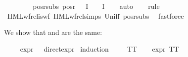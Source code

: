 \begin{isabellebody}
\ \ \ \ \isamarkupfalse%
\isanewline
\ \ \isamarkupfalse%
\isanewline
{}\isamarkupfalse%
%
\endisatagproof
{\isafoldproof}%
%
\isadelimproof
\isanewline
%
\endisadelimproof
\isanewline
{}\isamarkupfalse%
\ pos{\isacharunderscore}{\kern0pt}r{\isacharunderscore}{\kern0pt}subs{\isacharcolon}{\kern0pt}\ {\isachardoublequoteopen}pos{\isacharunderscore}{\kern0pt}r\ {\isacharparenleft}{\kern0pt}{\isasymPhi}\ {\isacharbackquote}{\kern0pt}\ I{\isacharparenright}{\kern0pt}\ {\isasymsubseteq}\ {\isacharparenleft}{\kern0pt}{\isasymPhi}\ {\isacharbackquote}{\kern0pt}\ I{\isacharparenright}{\kern0pt}{\isachardoublequoteclose}\isanewline
%
\isadelimproof
\ \ %
\endisadelimproof
%
\isatagproof
{}\isamarkupfalse%
\ auto%
\endisatagproof
{\isafoldproof}%
%
\isadelimproof
\isanewline
%
\endisadelimproof
\isanewline
{}\isamarkupfalse%
\isanewline
%
\isadelimproof
\ \ %
\endisadelimproof
%
\isatagproof
{}\isamarkupfalse%
\ rule\isanewline
\ \ \isamarkupfalse%
\ HML{\isacharunderscore}{\kern0pt}wf{\isacharunderscore}{\kern0pt}rel{\isacharunderscore}{\kern0pt}is{\isacharunderscore}{\kern0pt}wf\ HML{\isacharunderscore}{\kern0pt}wf{\isacharunderscore}{\kern0pt}rel{\isachardot}{\kern0pt}simps\ Un{\isacharunderscore}{\kern0pt}iff\ pos{\isacharunderscore}{\kern0pt}r{\isacharunderscore}{\kern0pt}subs\ \isamarkupfalse%
\ fastforce{\isacharplus}{\kern0pt}%
\endisatagproof
{\isafoldproof}%
%
\isadelimproof
%
\endisadelimproof
%
\begin{isamarkuptext}%
We show that  and  are the same:%
\end{isamarkuptext}\isamarkuptrue%
%
\isadelimvisible
%
\endisadelimvisible
%
\isatagvisible
%
\endisatagvisible
{\isafoldvisible}%
%
\isadelimvisible
\isanewline
%
\endisadelimvisible
{}\isamarkupfalse%
\ \isanewline
\ \ \ {\isachardoublequoteopen}expr\ {\isasymphi}\ {\isacharequal}{\kern0pt}\ direct{\isacharunderscore}{\kern0pt}expr\ {\isasymphi}{\isachardoublequoteclose}\isanewline
%
\isadelimproof
%
\endisadelimproof
%
\isatagproof
{}\isamarkupfalse%
{\isacharparenleft}{\kern0pt}induction\ {\isasymphi}{\isacharparenright}{\kern0pt}\isanewline
\ \ \isamarkupfalse%
\ TT\isanewline
\ \ \isamarkupfalse%
\ {\isachardoublequoteopen}expr\ TT\ {\isacharequal}{\kern0pt}\ {\isacharparenleft}{\kern0pt}{}{\isacharcomma}{\kern0pt}\ {}{\isacharcomma}{\kern0pt}\ {}{\isacharcomma}{\kern0pt}\ {}{\isacharcomma}{\kern0pt}\ {}{\isacharcomma}{\kern0pt}\ {}{\isacharparenright}{\kern0pt}{\isachardoublequoteclose}\ \isamarkupfalse%

\end{isabellebody}

